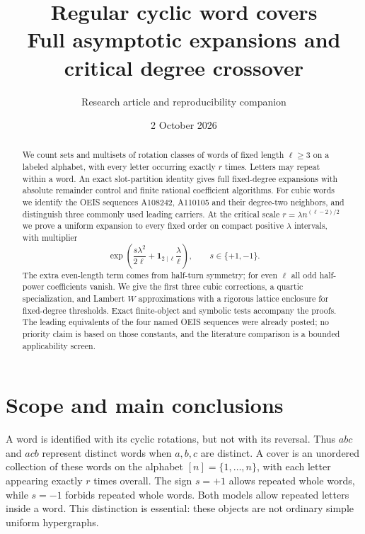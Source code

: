 \documentclass[11pt]{article}
\title{Regular cyclic word covers\\[4pt]\large Full asymptotic expansions and critical degree crossover}
\author{Research article and reproducibility companion}
\date{2 October 2026}
\theoremstyle{definition}\newtheorem{definition}[theorem]{Definition}
\theoremstyle{remark}\newtheorem{remark}[theorem]{Remark}
\newcommand{\ind}{\mathbf 1}
\numberwithin{equation}{section}
\begin{document}
\maketitle
\begin{abstract}
We count sets and multisets of rotation classes of words of fixed length $\ell\ge3$ on a labeled alphabet, with every letter occurring exactly $r$ times. Letters may repeat within a word. An exact slot-partition identity gives full fixed-degree expansions with absolute remainder control and finite rational coefficient algorithms. For cubic words we identify the OEIS sequences A108242, A110105 and their degree-two neighbors, and distinguish three commonly used leading carriers. At the critical scale $r=\lambda n^{(\ell-2)/2}$ we prove a uniform expansion to every fixed order on compact positive $\lambda$ intervals, with multiplier
\[
 \exp\!\left(\frac{s\lambda^2}{2\ell}
                 +\ind_{2\mid\ell}\frac{\lambda}{\ell}\right),
 \qquad s\in\{+1,-1\}.
\]
The extra even-length term comes from half-turn symmetry; for even $\ell$ all odd half-power coefficients vanish. We give the first three cubic corrections, a quartic specialization, and Lambert $W$ approximations with a rigorous lattice enclosure for fixed-degree thresholds. Exact finite-object and symbolic tests accompany the proofs. The leading equivalents of the four named OEIS sequences were already posted; no priority claim is based on those constants, and the literature comparison is a bounded applicability screen.
\end{abstract}
\tableofcontents

\section{Scope and main conclusions}\label{rcw:sec:scope}
A word is identified with its cyclic rotations, but not with its reversal. Thus $abc$ and $acb$ represent distinct words when $a,b,c$ are distinct. A cover is an unordered collection of these words on the alphabet $[n]=\{1,\ldots,n\}$, with each letter appearing exactly $r$ times overall. The sign $s=+1$ allows repeated whole words, while $s=-1$ forbids repeated whole words. Both models allow repeated letters inside a word. This distinction is essential: these objects are not ordinary simple uniform hypergraphs.
\end{document}
